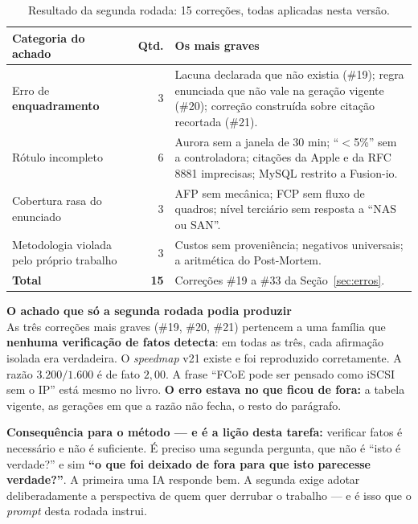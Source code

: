 \documentclass[11pt,a4paper]{article}
\newcommand{\destaque}[2]{%
  \begin{center}\begin{minipage}{0.96\textwidth}
  \colorbox{fundo}{\begin{minipage}{\dimexpr\linewidth-2\fboxsep}
  \vspace{2pt}\textbf{\color{azul}\small #1}\\[1pt]\footnotesize #2\vspace{3pt}
  \end{minipage}}\end{minipage}\end{center}}
\begin{document}
\begin{table}[H]
\centering
\caption{Resultado da segunda rodada: 15 correções, todas aplicadas nesta versão.}
\label{tab:adversarial2}
{\footnotesize
\begin{tabular}{@{}p{4.3cm}rp{8.6cm}@{}}
\toprule
\textbf{Categoria do achado} & \textbf{Qtd.} & \textbf{Os mais graves} \\
\midrule
Erro de \textbf{enquadramento} & 3 & Lacuna declarada que não existia (\#19); regra enunciada que
não vale na geração vigente (\#20); correção construída sobre citação recortada (\#21). \\
Rótulo incompleto & 6 & Aurora sem a janela de 30 min; ``$<$5\%'' sem a controladora; citações da
Apple e da RFC 8881 imprecisas; MySQL restrito a Fusion-io. \\
Cobertura rasa do enunciado & 3 & AFP sem mecânica; FCP sem fluxo de quadros; nível terciário sem
resposta a ``NAS ou SAN''. \\
Metodologia violada pelo próprio trabalho & 3 & Custos sem proveniência; negativos universais; a
aritmética do Post-Mortem. \\
\midrule
\textbf{Total} & \textbf{15} & Correções \#19 a \#33 da Seção~\ref{sec:erros}. \\
\bottomrule
\end{tabular}}
\end{table}

\destaque{O achado que só a segunda rodada podia produzir}{%
As três correções mais graves (\#19, \#20, \#21) pertencem a uma família que \textbf{nenhuma
verificação de fatos detecta}: em todas as três, cada afirmação isolada era verdadeira. O
\textit{speedmap} v21 existe e foi reproduzido corretamente. A razão $3.200/1.600$ é de fato
$2{,}00$. A frase ``FCoE pode ser pensado como iSCSI sem o IP'' está mesmo no livro. \textbf{O erro
estava no que ficou de fora:} a tabela vigente, as gerações em que a razão não fecha, o resto do
parágrafo.

\smallskip
\textbf{Consequência para o método --- e é a lição desta tarefa:} verificar fatos é necessário e não
é suficiente. É preciso uma segunda pergunta, que não é ``isto é verdade?'' e sim \textbf{``o que
foi deixado de fora para que isto parecesse verdade?''}. A primeira uma IA responde bem. A segunda
exige adotar deliberadamente a perspectiva de quem quer derrubar o trabalho --- e é isso que o
\textit{prompt} desta rodada instrui.}
\end{document}
